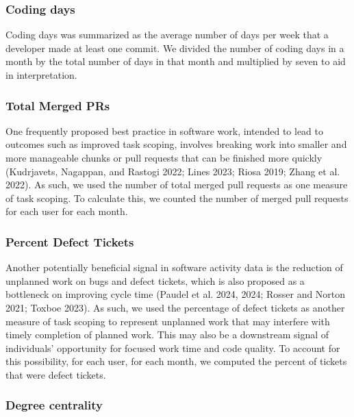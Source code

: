 \documentclass[
]{article}
\begin{document}
\subsubsection{Coding days}\label{coding-days}

Coding days was summarized as the average number of days per week that a
developer made at least one commit. We divided the number of coding days
in a month by the total number of days in that month and multiplied by
seven to aid in interpretation.

\subsubsection{Total Merged PRs}\label{total-merged-prs}

One frequently proposed best practice in software work, intended to lead
to outcomes such as improved task scoping, involves breaking work into
smaller and more manageable chunks or pull requests that can be finished
more quickly (Kudrjavets, Nagappan, and Rastogi 2022; Lines 2023; Riosa
2019; Zhang et al. 2022). As such, we used the number of total merged
pull requests as one measure of task scoping. To calculate this, we
counted the number of merged pull requests for each user for each month.

\subsubsection{Percent Defect Tickets}\label{percent-defect-tickets}

Another potentially beneficial signal in software activity data is the
reduction of unplanned work on bugs and defect tickets, which is also
proposed as a bottleneck on improving cycle time (Paudel et al. 2024,
2024; Rosser and Norton 2021; Toxboe 2023). As such, we used the
percentage of defect tickets as another measure of task scoping to
represent unplanned work that may interfere with timely completion of
planned work. This may also be a downstream signal of individuals'
opportunity for focused work time and code quality. To account for this
possibility, for each user, for each month, we computed the percent of
tickets that were defect tickets.

\subsubsection{Degree centrality}\label{degree-centrality}
\end{document}
